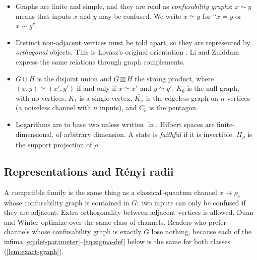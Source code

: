 \documentclass[11pt]{article}
\theoremstyle{definition}
\newtheorem{definition}[theorem]{Definition}
\newcommand{\boxt}{\boxtimes}
\begin{document}
\begin{tcolorbox}[colback=gray!4,colframe=gray!45,boxrule=0.5pt,arc=2pt,
  left=6pt,right=6pt,top=4pt,bottom=4pt,title={\small Conventions},
  fonttitle=\bfseries,coltitle=black,colbacktitle=gray!15]
\small
\begin{itemize}[leftmargin=1.2em,itemsep=2pt,topsep=2pt]
\item Graphs are finite and simple, and they are read as \emph{confusability
graphs}: $x\sim y$ means that inputs $x$ and $y$ may be confused.  We write
$x\simeq y$ for ``$x=y$ or $x\sim y$''.
\item Distinct non-adjacent vertices must be told apart, so they are
represented by \emph{orthogonal} objects.  This is Lov\'asz's original
orientation \cite{Lovasz1979}.  Li and Zuiddam express the same relations
through graph complements.
\item $G\sqcup H$ is the disjoint union and $G\boxt H$ the strong product,
where $(x,y)\simeq(x',y')$ if and only if $x\simeq x'$ and $y\simeq y'$.
$K_0$ is the null graph, with no vertices, $K_1$ is a single vertex,
$\overline{K_n}$ is the edgeless graph on $n$
vertices (a noiseless channel with $n$ inputs), and $C_5$ is the pentagon.
\item Logarithms are to base two unless written $\ln$.  Hilbert spaces are
finite-dimensional, of arbitrary dimension.  A state is \emph{faithful} if it
is invertible.  $\Pi_\rho$ is the support projection of $\rho$.
\end{itemize}
\end{tcolorbox}

\subsection{Representations and R\'enyi radii}


A compatible family is the same thing as a classical--quantum channel
$x\mapsto\rho_x$ whose confusability graph is contained in $G$: two inputs can
only be confused if they are adjacent.  Extra orthogonality between adjacent
vertices is allowed.  Duan and Winter optimize over the same class of channels.
Readers who prefer channels whose confusability graph is exactly $G$ lose
nothing, because each of the infima
\eqref{eq:def-parameter}--\eqref{eq:sigma-def} below is the same for both
classes (\cref{lem:exact-graph}).
\end{document}

